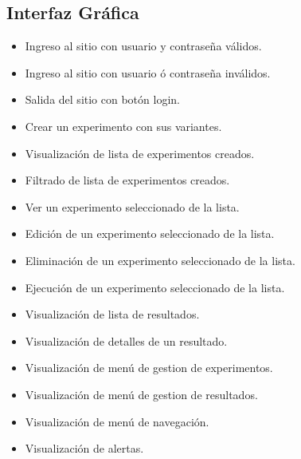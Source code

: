 \subsection{Interfaz Gr\'afica}
\begin{itemize}
\item Ingreso al sitio con usuario y contrase\~na v\'alidos.
\item Ingreso al sitio con usuario ó contrase\~na inv\'alidos.
\item Salida del sitio con bot\'on login.

\item Crear un experimento con sus variantes.

\item Visualizaci\'on de lista de experimentos creados.
\item Filtrado de lista de experimentos creados.

\item Ver un experimento seleccionado de la lista.
\item Edici\'on de un experimento seleccionado de la lista.
\item Eliminaci\'on de un experimento seleccionado de la lista.
\item Ejecuci\'on de un experimento seleccionado de la lista.

\item Visualizaci\'on de lista de resultados.
\item Visualizaci\'on de detalles de un resultado.
\item Visualizaci\'on de men\'u de gestion de experimentos.
\item Visualizaci\'on de men\'u de gestion de resultados.
\item Visualizaci\'on de men\'u de navegaci\'on.
\item Visualizaci\'on de alertas.
\end{itemize}
\newpage